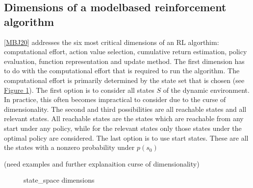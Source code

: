 \documentclass[letterpaper,10pt,english]{jupyterBook}
\let\sphinxpxdimen\pdfpxdimen\else\newdimen\sphinxpxdimen
\begin{document}
\subsection{Dimensions of a model\sphinxhyphen{}based reinforcement algorithm}
\label{\detokenize{Reinforcement_learning:dimensions-of-a-model-based-reinforcement-algorithm}}
\sphinxAtStartPar
{[}\hyperlink{cite.Discussion:id7}{MBJ20}{]} addresses the six most critical dimensions of an RL algorthim: computational effort, action value selection, cumulative return estimation, policy evaluation, function representation and update method. The first dimension has to do with the computational effort that is required to run the algorithm. The computational effort is primarily determined by the state set that is chosen (see \hyperref[\detokenize{Reinforcement_learning:state-space-fig}]{Figure \ref{\detokenize{Reinforcement_learning:state-space-fig}}}). The first option is to consider all states \(S\) of the dynamic environment. In practice, this often becomes impractical to consider due to the curse of dimensionality. The second and third possibilities are all reachable states and all relevant states. All reachable states are the states which are reachable from any start under any policy, while for the relevant states only those states under the optimal policy are considered. The last option is to use start states. These are all the states with a non\sphinxhyphen{}zero probability under \(p(s_0)\)

\sphinxAtStartPar
(need examples and further explanaition curse of dimensionality)

\begin{figure}[htbp]
\centering
\capstart

\noindent\sphinxincludegraphics[width=500\sphinxpxdimen,height=350\sphinxpxdimen]{{state_space}.png}
\caption{state\_space dimensions}\label{\detokenize{Reinforcement_learning:state-space-fig}}\end{figure}
\end{document}
